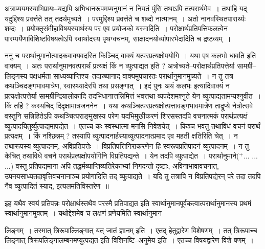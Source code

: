 \documentclass[article,12pt,a4paper]{memoir}
\newcommand{\add}[1]{($^{+}$#1)}
\begin{document}
	  \pstart अत्राप्ययमस्याभिप्रायः--यद्यपि अभिधानरूपमप्यनुमानं न नियतं पुंसि तथाऽपि तत्परार्थमेव । तथाहि यद् यदुद्दिश्य प्रवर्त्तते तत् तदर्थमुच्यते । परमुद्दिश्य प्रवर्त्तते च शब्दो नात्मानम् । अतो नानवस्थितपारार्थ्यः शब्दः । प्रयोक्तृसंमीहाविषयस्यार्थस्य पर एव प्रयोजको यस्मादिति । परोक्षार्थप्रतिपत्तिफलत्वेन पारम्पर्येणाविशिष्टविषयत्वेऽपि स्वार्थादस्य पृथग्वचनम्, साक्षादनयोर्व्यापारभेदादिति च द्रष्टव्यम् ।
	\pend
      

	  \pstart ननु च परार्थानुमानोत्पादकवाक्यवदस्ति किञ्चिद् वाक्यं यत्परप्रत्यक्षोपयोगि । यथा एष कलभो धावति इति वाक्यम् । अतः परार्थानुमानवत्परार्थं प्रत्यक्षं किं न व्युत्पाद्यत इति ? अत्रोच्यते--परोक्षार्थप्रतिपत्तेर्या सामग्री--लिङ्गस्य पक्षधर्मता साध्यव्याप्तिश्च--तदाख्यानाद् वाक्यमुपचारतः परार्थानुमानमुच्यते । न तु तत्र कथञ्चिदङ्गभावमात्रेण, स्वास्थ्यादेरपि तथा प्रसङ्गात् । इदं पुनः अयं कलभः इत्यादिवाक्यं न प्रत्यक्षोत्पत्तेर्या सामग्रीन्द्रियालोकादि तदभिधानात्तन्निमित्तं भवत्तथा व्यपदेशमश्नुते येन व्युत्पाद्यतामप्यश्नुवीत । किं तर्हि ? कस्यचिद् दिदृक्षामात्रजननेन । यथा कथञ्चित्परप्रत्यक्षोत्पत्तावङ्गभावमात्रेण ताद्रूप्ये नेत्रोत्सवे वस्तुनि सन्निहितेऽपि कथञ्चित्पराङ्मुखस्य परेण यदभिमुखीकरणं \leavevmode{} शिरसस्तदपि वचनात्मकं परार्थप्रत्यक्षं व्युत्पादयितुर्व्युत्पाद्यमापद्येत । एतच्च कः स्वस्थात्मा मनसि निवेशयेत् । किञ्च भवतु तथाविधं वचनं परार्थं प्रत्यक्षम् । किं नश्छिन्नम् ? तस्यापि व्युत्पादनार्हस्याव्युत्पादनात्प्रमाद एव महती क्षतिरिति चेत् । न तथारूपस्य व्युत्पादनम्, अविप्रतिपत्तेः । विप्रतिपत्तिनिराकरणेन हि स्वरूपप्रतिपादनं व्युत्पादनम् । न तु केचित् तथाविधे वचने परार्थप्रत्यक्षोपयोगिनि विप्रतिपद्यन्ते । येन तदपि व्युत्पाद्येत । परार्थानुमाने\add{... ... ...} वस्तु प्रतिपद्यमाना अपि तद्धर्मव्याप्तिव्यतिरेकाभ्यां निगदन्तो दृष्टाः, अविनाभावावचनात्, उपनयसाध्यतदावृत्तिवचनानाञ्च प्रयोगादिति तद् व्युत्पाद्यते । यदि तु तत्रापि न विप्रतिपद्येरन् परे तदा तदपि नैव व्युत्पादितं स्याद्, इत्यलमतिविस्तरेण ॥
	\pend
      

	  \pstart इह यथैव स्वयं प्रतिपन्नः परोक्षार्थस्तथैव परस्मै प्रतिपाद्यत इति स्वार्थानुमानपूर्वकत्वात्परार्थानुमानस्य प्रथमं स्वार्थानुमानमुक्तम् । यथोद्देशमेव च लक्षणं प्रणेयमिति स्वार्थानुमान  \leavevmode{} 
	  
	लिङ्गम् । तस्मात् त्रिरूपाल्लिङ्गात् यत् जातं ज्ञानम् इति । एतद् हेतुद्वारेण विशेषणम् । तत् त्रिरूपाच्च लिङ्गात् त्रिरूपलिङ्गालम्बनमप्युत्पद्यत इति विशिनष्टि--अनुमेय इति । एतच्च विषयद्वारेण विशे षणम् ।  
	  
\end{document}
